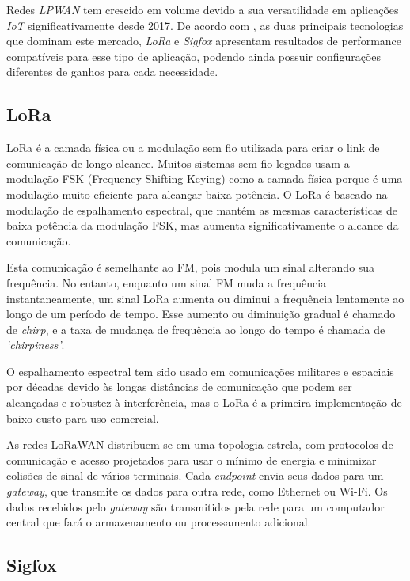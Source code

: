 Redes \textit{LPWAN} tem crescido em volume devido a sua versatilidade em aplicações \textit{IoT} significativamente desde 2017. De acordo com , as duas principais tecnologias que dominam este mercado, \textit{LoRa} e \textit{Sigfox} apresentam resultados de performance compatíveis para esse tipo de aplicação, podendo ainda possuir configurações diferentes de ganhos para cada necessidade.


\subsection{LoRa}
LoRa\cite{LoRaAlliance} é a camada física ou a modulação sem fio utilizada para criar o link de comunicação de longo alcance. Muitos sistemas sem fio legados usam a modulação FSK (Frequency Shifting Keying) como a camada física porque é uma modulação muito eficiente para alcançar baixa potência. O LoRa é baseado na modulação de espalhamento espectral, que mantém as mesmas características de baixa potência da modulação FSK, mas aumenta significativamente o alcance da comunicação. 

Esta comunicação é semelhante ao FM, pois modula um sinal alterando sua frequência. No entanto, enquanto um sinal FM muda a frequência instantaneamente, um sinal LoRa aumenta ou diminui a frequência lentamente ao longo de um período de tempo. Esse aumento ou diminuição gradual é chamado de \textit{chirp}, e a taxa de mudança de frequência ao longo do tempo é chamada de \textit{`chirpiness'}. 

O espalhamento espectral tem sido usado em comunicações militares e espaciais por décadas devido às longas distâncias de comunicação que podem ser alcançadas e robustez à interferência, mas o LoRa é a primeira implementação de baixo custo para uso comercial.

As redes LoRaWAN distribuem-se em uma topologia estrela, com protocolos de comunicação e acesso projetados para usar o mínimo de energia e minimizar colisões de sinal de vários terminais. Cada \textit{endpoint} envia seus dados para um \textit{gateway}, que transmite os dados para outra rede, como Ethernet ou Wi-Fi. Os dados recebidos pelo \textit{gateway} são transmitidos pela rede para um computador central que fará o armazenamento ou processamento adicional.
\subsection{Sigfox}

